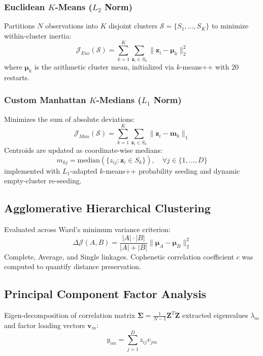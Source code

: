\documentclass[conference]{IEEEtran}
\begin{document}
\subsubsection{Euclidean $K$-Means ($L_2$ Norm)}
Partitions $N$ observations into $K$ disjoint clusters $\mathcal{S} = \{S_1, \dots, S_K\}$ to minimize within-cluster inertia:
\begin{equation}
\mathcal{J}_{Euc}(\mathcal{S}) = \sum_{k=1}^K \sum_{\mathbf{z}_i \in S_k} \|\mathbf{z}_i - \boldsymbol{\mu}_k\|_2^2
\end{equation}
where $\boldsymbol{\mu}_k$ is the arithmetic cluster mean, initialized via $k$-means++ with 20 restarts.

\subsubsection{Custom Manhattan $K$-Medians ($L_1$ Norm)}
Minimizes the sum of absolute deviations:
\begin{equation}
\mathcal{J}_{Man}(\mathcal{S}) = \sum_{k=1}^K \sum_{\mathbf{z}_i \in S_k} \|\mathbf{z}_i - \mathbf{m}_k\|_1
\end{equation}
Centroids are updated as coordinate-wise medians:
\begin{equation}
m_{kj} = \text{median}\left(\{z_{ij} : \mathbf{z}_i \in S_k\}\right), \quad \forall j \in \{1, \dots, D\}
\end{equation}
implemented with $L_1$-adapted $k$-means++ probability seeding and dynamic empty-cluster re-seeding.

\subsection{Agglomerative Hierarchical Clustering}
Evaluated across Ward's minimum variance criterion:
\begin{equation}
\Delta \mathcal{J}(A, B) = \frac{|A| \cdot |B|}{|A| + |B|} \|\boldsymbol{\mu}_A - \boldsymbol{\mu}_B\|_2^2
\end{equation}
Complete, Average, and Single linkages. Cophenetic correlation coefficient $c$ was computed to quantify distance preservation.

\subsection{Principal Component Factor Analysis}
Eigen-decomposition of correlation matrix $\mathbf{\Sigma} = \frac{1}{N-1} \mathbf{Z}^T \mathbf{Z}$ extracted eigenvalues $\lambda_m$ and factor loading vectors $\mathbf{v}_m$:
\begin{equation}
y_{im} = \sum_{j=1}^D z_{ij} v_{jm}
\end{equation}
\end{document}
